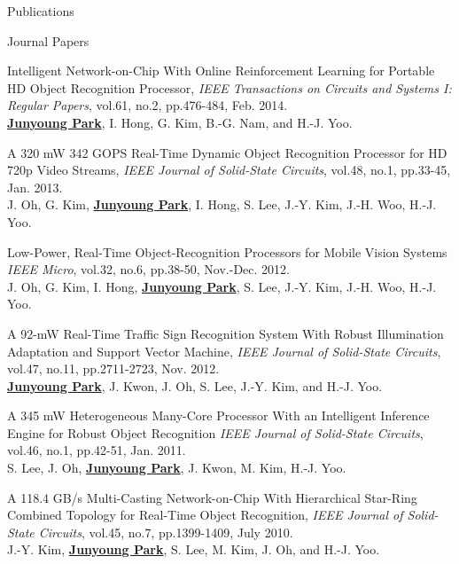 \documentclass{resume} %
\begin{document}
\begin{section}{Publications}

\begin{subsection}{Journal Papers}{}{}{}

\item Intelligent Network-on-Chip With Online Reinforcement Learning for Portable HD Object Recognition Processor, \emph{IEEE Transactions on Circuits and Systems I: Regular Papers}, vol.61, no.2, pp.476-484, Feb. 2014. \\
\underline{\bf Junyoung Park}, I. Hong, G. Kim, B.-G. Nam, and H.-J. Yoo.

\item A 320 mW 342 GOPS Real-Time Dynamic Object Recognition Processor for HD 720p Video Streams, \emph{IEEE Journal of Solid-State Circuits}, vol.48, no.1, pp.33-45, Jan. 2013. \\
J. Oh, G. Kim, \underline{\bf Junyoung Park}, I. Hong, S. Lee, J.-Y. Kim, J.-H. Woo, H.-J. Yoo.

\item Low-Power, Real-Time Object-Recognition Processors for Mobile Vision Systems \emph{IEEE Micro}, vol.32, no.6, pp.38-50, Nov.-Dec. 2012. \\
J. Oh, G. Kim, I. Hong, \underline{\bf Junyoung Park}, S. Lee, J.-Y. Kim, J.-H. Woo, H.-J. Yoo.

\item A 92-mW Real-Time Traffic Sign Recognition System With Robust Illumination Adaptation and Support Vector Machine, \emph{IEEE Journal of Solid-State Circuits}, vol.47, no.11, pp.2711-2723, Nov. 2012. \\
\underline{\bf Junyoung Park}, J. Kwon, J. Oh, S. Lee, J.-Y. Kim, and H.-J. Yoo.

\item A 345 mW Heterogeneous Many-Core Processor With an Intelligent Inference Engine for Robust Object Recognition \emph{IEEE Journal of Solid-State Circuits}, vol.46, no.1, pp.42-51, Jan. 2011. \\
S. Lee, J. Oh, \underline{\bf Junyoung Park}, J. Kwon, M. Kim, H.-J. Yoo.

\item A 118.4 GB/s Multi-Casting Network-on-Chip With Hierarchical Star-Ring Combined Topology for Real-Time Object Recognition, \emph{IEEE Journal of Solid-State Circuits}, vol.45, no.7, pp.1399-1409, July 2010. \\
J.-Y. Kim, \underline{\bf Junyoung Park}, S. Lee, M. Kim, J. Oh, and H.-J. Yoo.


\end{subsection}
\end{section}
\end{document}
